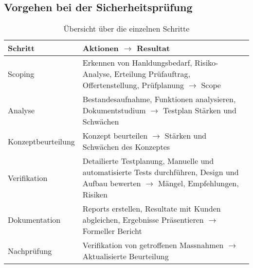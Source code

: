 \subsection{Vorgehen bei der Sicherheitsprüfung}
\begin{table}[H]
	\begin{tabularx}{\textwidth}{l|X}
		\textbf{Schritt} & \textbf{Aktionen $ \rightarrow $ Resultat}\\ \hline
		Scoping & Erkennen von Hanldungsbedarf, Risiko-Analyse, Erteilung Prüfauftrag, Offertenstellung, Prüfplanung $ \rightarrow $ Scope\\ \hline
		Analyse & Bestandesaufnahme, Funktionen analysieren, Dokumentstudium $ \rightarrow $ Testplan Stärken und Schwächen\\ \hline
		Konzeptbeurteilung & Konzept beurteilen $ \rightarrow $ Stärken und Schwächen des Konzeptes\\ \hline
		Verifikation & Detailierte Testplanung, Manuelle und automatisierte Tests durchführen, Design und Aufbau bewerten $ \rightarrow $ Mängel, Empfehlungen, Risiken\\ \hline
		Dokumentation & Reports erstellen, Resultate mit Kunden abgleichen, Ergebnisse Präsentieren $ \rightarrow $ Formeller Bericht\\ \hline
		Nachprüfung & Verifikation von getroffenen Massnahmen $ \rightarrow $ Aktualisierte Beurteilung\\ \hline
	\end{tabularx}
	\caption{Übersicht über die einzelnen Schritte}
\end{table}
